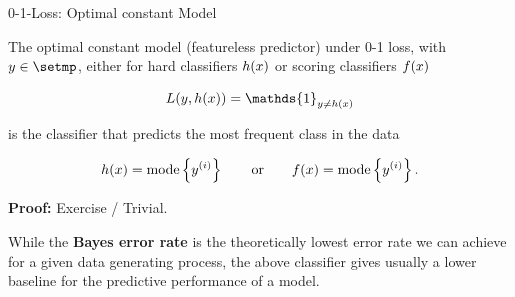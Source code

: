 \begin{vbframe}{0-1-Loss: Optimal constant Model}

The optimal constant model (featureless predictor) under 0-1 loss, with $y \in \setmp$, either for hard classifiers $h(x)$ or scoring classifiers $f(x)$ 

$$
  L(y, \hx) = \mathds{1}_{y \neq \hx}
$$

is the classifier that predicts the most frequent class in the data


$$
h(x) = \text{mode} \left\{y^{(i)}\right\} \qquad \text{or} \qquad f(x) = \text{mode} \left\{y^{(i)}\right\}.
$$

\textbf{Proof:} Exercise / Trivial. 

\lz 

While the \textbf{Bayes error rate} is the theoretically lowest error rate we can achieve for a given data generating process, the above classifier gives usually a lower baseline for the predictive performance of a model. 



\end{vbframe}


\endlecture

